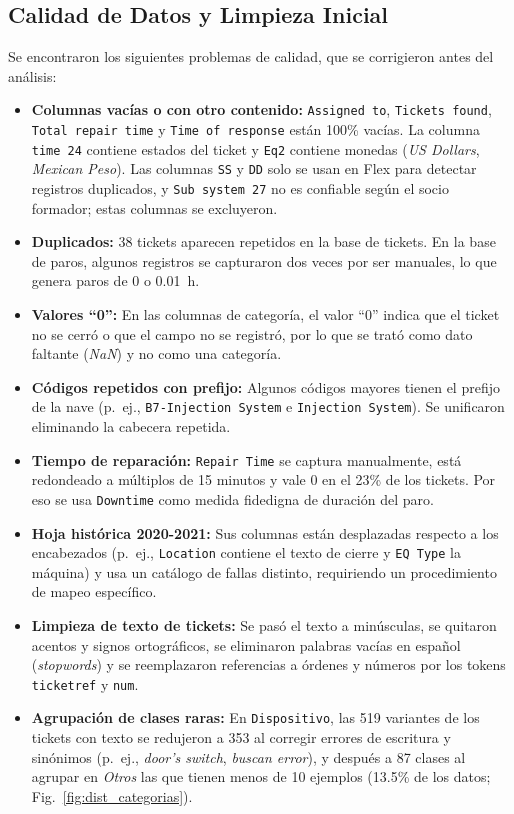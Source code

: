 \documentclass[conference]{IEEEtran}
\begin{document}
\subsection{Calidad de Datos y Limpieza Inicial}
Se encontraron los siguientes problemas de calidad, que se corrigieron antes del análisis:
\begin{itemize}
    \item \textbf{Columnas vacías o con otro contenido:} \texttt{Assigned to}, \texttt{Tickets found}, \texttt{Total repair time} y \texttt{Time of response} están 100\% vacías. La columna \texttt{time 24} contiene estados del ticket y \texttt{Eq2} contiene monedas (\textit{US Dollars}, \textit{Mexican Peso}). Las columnas \texttt{SS} y \texttt{DD} solo se usan en Flex para detectar registros duplicados, y \texttt{Sub system 27} no es confiable según el socio formador; estas columnas se excluyeron.
    \item \textbf{Duplicados:} 38 tickets aparecen repetidos en la base de tickets. En la base de paros, algunos registros se capturaron dos veces por ser manuales, lo que genera paros de 0 o 0.01~h.
    \item \textbf{Valores ``0'':} En las columnas de categoría, el valor ``0'' indica que el ticket no se cerró o que el campo no se registró, por lo que se trató como dato faltante (\textit{NaN}) y no como una categoría.
    \item \textbf{Códigos repetidos con prefijo:} Algunos códigos mayores tienen el prefijo de la nave (p.~ej., \texttt{B7-Injection System} e \texttt{Injection System}). Se unificaron eliminando la cabecera repetida.
    \item \textbf{Tiempo de reparación:} \texttt{Repair Time} se captura manualmente, está redondeado a múltiplos de 15 minutos y vale 0 en el 23\% de los tickets. Por eso se usa \texttt{Downtime} como medida fidedigna de duración del paro.
    \item \textbf{Hoja histórica 2020-2021:} Sus columnas están desplazadas respecto a los encabezados (p.~ej., \texttt{Location} contiene el texto de cierre y \texttt{EQ Type} la máquina) y usa un catálogo de fallas distinto, requiriendo un procedimiento de mapeo específico.
    \item \textbf{Limpieza de texto de tickets:} Se pasó el texto a minúsculas, se quitaron acentos y signos ortográficos, se eliminaron palabras vacías en español (\textit{stopwords}) y se reemplazaron referencias a órdenes y números por los tokens \texttt{ticketref} y \texttt{num}.
    \item \textbf{Agrupación de clases raras:} En \texttt{Dispositivo}, las 519 variantes de los tickets con texto se redujeron a 353 al corregir errores de escritura y sinónimos (p.~ej., \textit{door's switch}, \textit{buscan error}), y después a 87 clases al agrupar en \textit{Otros} las que tienen menos de 10 ejemplos (13.5\% de los datos; Fig.~\ref{fig:dist_categorias}).
\end{itemize}
\end{document}
